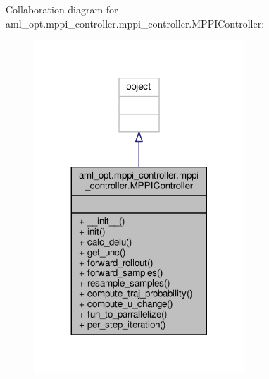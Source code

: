 Collaboration diagram for aml\-\_\-opt.\-mppi\-\_\-controller.\-mppi\-\_\-controller.\-M\-P\-P\-I\-Controller\-:
\nopagebreak
\begin{figure}[H]
\begin{center}
\leavevmode
\includegraphics[width=224pt]{classaml__opt_1_1mppi__controller_1_1mppi__controller_1_1_m_p_p_i_controller__coll__graph}
\end{center}
\end{figure}
